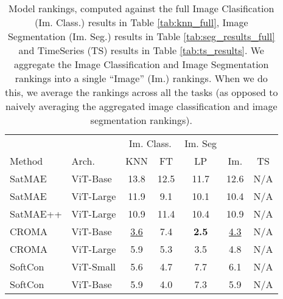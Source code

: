 \begin{table}[!t]
\centering
\caption{Model rankings, computed against the full Image Clasification (Im. Class.) results in Table \ref{tab:knn_full}, Image Segmentation (Im. Seg.) results in Table \ref{tab:seg_results_full} and TimeSeries (TS) results in Table \ref{tab:ts_results}. We aggregate the Image Classification and Image Segmentation rankings into a single ``Image'' (Im.) rankings. When we do this, we average the rankings across all the tasks (as opposed to naively averaging the aggregated image classification and image segmentation rankings).}
\label{tab:ranks}
    \begin{tabular}{
        l
        l
        c
        c
        c
        c
        c
    }
    \toprule
        & & \multicolumn{2}{c}{Im. Class.} & Im. Seg & \\
        \cmidrule(lr){3-4} 
        \cmidrule(lr){5-5}
        Method & Arch. & KNN & FT & LP & Im. & TS
         \\
        \midrule
        SatMAE \cite{cong2022satmae} & ViT-Base & {\color{customgray} 13.8} & {\color{customgray} 12.5} & {\color{customgray} 11.7} & 12.6 & {\color{missinggray} N/A} \\
        SatMAE \cite{cong2022satmae} & ViT-Large & {\color{customgray} 11.9} & {\color{customgray} 9.1} & {\color{customgray} 10.1} & 10.4 & {\color{missinggray} N/A}  \\
        SatMAE++ \cite{noman2024rethinking} & ViT-Large & {\color{customgray} 10.9} & {\color{customgray} 11.4} & {\color{customgray} 10.4} & 10.9 & {\color{missinggray} N/A} \\
        CROMA \cite{fuller2024croma} & ViT-Base & {\color{customgray} \underline{3.6}} & {\color{customgray} 7.4} & {\color{customgray} \textbf{2.5}} & \underline{4.3} &  {\color{missinggray} N/A} \\
        CROMA \cite{fuller2024croma} & ViT-Large & {\color{customgray} 5.9} & {\color{customgray} 5.3} & {\color{customgray} 3.5} & 4.8 & {\color{missinggray} N/A}  \\
        SoftCon \cite{wang2024multi} & ViT-Small & {\color{customgray} 5.6} & {\color{customgray} 4.7} & {\color{customgray} 7.7} & 6.1 & {\color{missinggray} N/A}  \\
        SoftCon \cite{wang2024multi} & ViT-Base & {\color{customgray} 5.9} & {\color{customgray} 4.0} & {\color{customgray} 7.3} & 5.9 & {\color{missinggray} N/A}  \\

\end{tabular}
\end{table}
